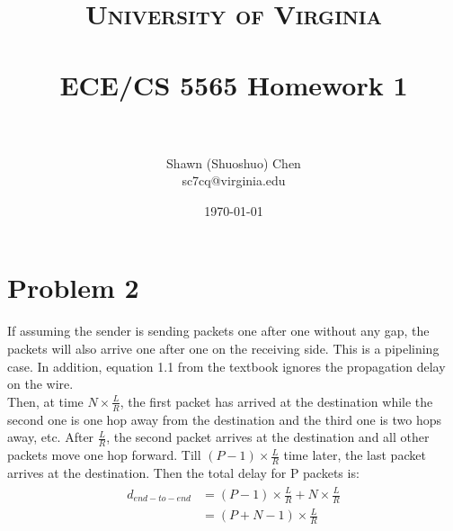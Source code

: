 \documentclass[titlepage, paper=a4, fontsize=11pt]{scrartcl} %
\title{	
\normalfont \normalsize 
\textsc{University of Virginia} \\ [25pt] %
\horrule{0.5pt} \\[0.4cm] %
\huge ECE/CS 5565 Homework 1 \\ %
\horrule{2pt} \\[0.5cm] %
}
\author{Shawn (Shuoshuo) Chen\\sc7cq@virginia.edu} %
\date{\normalsize\today} %
\numberwithin{equation}{section} %
\numberwithin{figure}{section} %
\numberwithin{table}{section} %
\begin{document}
\maketitle %


\section*{Problem 2}

If assuming the sender is sending packets one after one without any gap, the packets will also arrive one after one
on the receiving side. This is a pipelining case. In addition, equation 1.1 from the textbook ignores the propagation delay on the wire.
\\

Then, at time $N \times \frac{L}{R}$, the first packet has arrived at the destination while the second one is one hop away from the destination and the third one is two hops away, etc. After $\frac{L}{R}$, 
the second packet arrives at the destination and all other packets move one hop forward.
Till $(P-1) \times \frac{L}{R}$ time later, the last packet arrives at the destination. Then the total delay for P packets is:
\begin{align*} 
\begin{split}
d_{end-to-end} &= (P-1) \times \frac{L}{R} + N \times \frac{L}{R} \\
&= (P+N-1) \times \frac{L}{R}
\end{split}					
\end{align*}
\\


\end{document}
